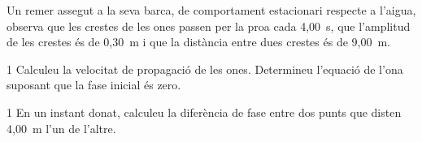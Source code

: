 Un remer assegut a la seva barca, de comportament estacionari respecte a l'aigua, observa que les crestes de les ones passen per la proa cada 4,00~s, que l'amplitud de les crestes és de 0,30~m i que la distància entre dues crestes és de 9,00~m.

\begin{apartat}{1}
Calculeu la velocitat de propagació de les ones. Determineu l'equació de l'ona suposant que la fase inicial és zero.
\end{apartat}

\begin{apartat}{1}
En un instant donat, calculeu la diferència de fase entre dos punts que disten 4,00~m l'un de l'altre.
\end{apartat}
